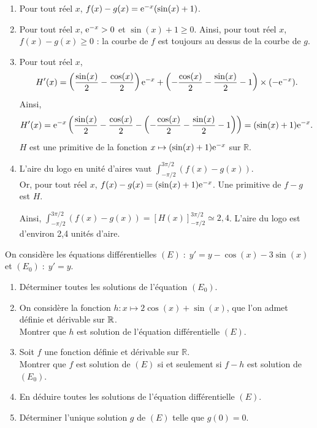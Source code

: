 \documentclass[11pt,fleqn, openany]{book} %
\begin{document}
\begin{solution}
\begin{enumerate}
\item Pour tout réel $x$, $f(x)-g(x)=\mathrm{e}^{-x}(\sin(x)+1)$.
\item Pour tout réel $x$, $\mathrm{e}^{-x}>0$ et $\sin(x)+1 \geqslant 0$. Ainsi, pour tout réel $x$, $f(x)-g(x)\geqslant 0$ : la courbe de $f$ est toujours au dessus de la courbe de $g$.
\item Pour tout réel $x$,
\[H'(x)=\left(\dfrac{\sin(x)}{2}-\dfrac{\cos(x)}{2}\right)\mathrm{e}^{-x}+\left(-\dfrac{\cos(x)}{2}-\dfrac{ \sin(x)}{2}-1\right) \times(-\mathrm{e}^{-x}).\]
Ainsi,
\[H'(x)=\mathrm{e}^{-x}\left(\dfrac{\sin(x)}{2}-\dfrac{\cos(x)}{2}-\left(-\dfrac{\cos(x)}{2}-\dfrac{ \sin(x)}{2}-1\right) \right)=(\sin(x)+1)\mathrm{e}^{-x}.\]
 $H$ est une primitive de la fonction  $x\mapsto (\sin(x)+1)\mathrm{e}^{-x}$ sur $\mathbb{R}$.
\item L'aire du logo en unité d'aires vaut $\displaystyle\int_{-\pi/2}^{3\pi/2}(f(x)-g(x))$. \\ Or, pour tout réel $x$, $f(x)-g(x)=(\sin(x)+1)\mathrm{e}^{-x}$. Une primitive de $f-g$ est $H$. 

Ainsi, $\displaystyle\int_{-\pi/2}^{3\pi/2}(f(x)-g(x)) = \left[H(x)\right]_{-\pi/2}^{3\pi/2} \simeq 2,4$. L'aire du logo est d'environ 2,4 unités d'aire.
\end{enumerate}
\newpage
\end{solution}

\begin{exercise}[subtitle={(Centres étrangers 2024)}]

On considère les équations différentielles $(E)\; : \; y'=y-\cos(x)-3\sin(x)$ et $(E_0)\; : \; y'=y$.

\begin{enumerate}
\item Déterminer toutes les solutions de l'équation $(E_0)$.
\item On considère la fonction $h:x\mapsto 2\cos(x)+\sin(x)$, que l'on admet définie et dérivable sur $\mathbb{R}$. \\Montrer que $h$ est solution de l'équation différentielle $(E)$.
\item Soit $f$ une fonction définie et dérivable sur $\mathbb{R}$. \\Montrer que $f$ est solution de $(E)$ si et seulement si $f-h$ est solution de $(E_0)$.
\item En déduire toutes les solutions de l'équation différentielle $(E)$.
\item Déterminer l'unique solution $g$ de $(E)$ telle que $g(0)=0$.
\end{enumerate}

\end{exercise}
\end{document}
